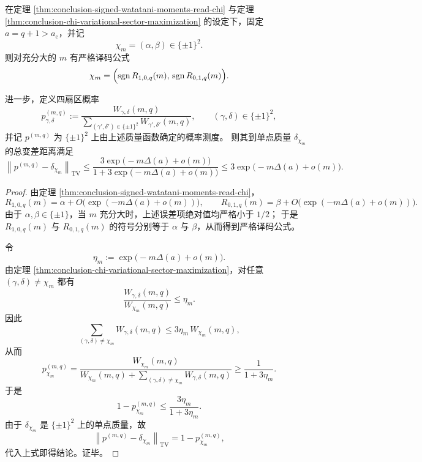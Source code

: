 \begin{theorem}[冻结相中指纹扇区的严格译码律与总变差收缩]\label{thm:conclusion-window6-sheet-parity-strict-decoding-tv}
在定理 \ref{thm:conclusion-signed-watatani-moments-read-chi} 与定理 \ref{thm:conclusion-chi-variational-sector-maximization} 的设定下，固定 \(a=q+1>a_{\mathrm c}\)，并记
\[
\chi_m=(\alpha,\beta)\in\{\pm1\}^2.
\]
则对充分大的 \(m\) 有严格译码公式
\[
\chi_m=
\Bigl(
\operatorname{sgn}R_{1,0,q}(m),\,
\operatorname{sgn}R_{0,1,q}(m)
\Bigr).
\]

进一步，定义四扇区概率
\[
p_{\gamma,\delta}^{(m,q)}
:=
\frac{W_{\gamma,\delta}(m,q)}
{\sum_{(\gamma',\delta')\in\{\pm1\}^2}W_{\gamma',\delta'}(m,q)},
\qquad
(\gamma,\delta)\in\{\pm1\}^2,
\]
并记 \(p^{(m,q)}\) 为 \(\{\pm1\}^2\) 上由上述质量函数确定的概率测度。
则其到单点质量 \(\delta_{\chi_m}\) 的总变差距离满足
\[
\left\|p^{(m,q)}-\delta_{\chi_m}\right\|_{\mathrm{TV}}
\le
\frac{3\exp\!\bigl(-m\Delta(a)+o(m)\bigr)}
{1+3\exp\!\bigl(-m\Delta(a)+o(m)\bigr)}
\le
3\exp\!\bigl(-m\Delta(a)+o(m)\bigr).
\]
\end{theorem}
\begin{proof}
由定理 \ref{thm:conclusion-signed-watatani-moments-read-chi}，
\[
R_{1,0,q}(m)=\alpha+O\!\bigl(\exp(-m\Delta(a)+o(m))\bigr),
\qquad
R_{0,1,q}(m)=\beta+O\!\bigl(\exp(-m\Delta(a)+o(m))\bigr).
\]
由于 \(\alpha,\beta\in\{\pm1\}\)，当 \(m\) 充分大时，上述误差项绝对值均严格小于 \(1/2\)；
于是 \(R_{1,0,q}(m)\) 与 \(R_{0,1,q}(m)\) 的符号分别等于 \(\alpha\) 与 \(\beta\)，从而得到严格译码公式。
\par
令
\[
\eta_m:=\exp\!\bigl(-m\Delta(a)+o(m)\bigr).
\]
由定理 \ref{thm:conclusion-chi-variational-sector-maximization}，对任意 \((\gamma,\delta)\neq \chi_m\) 都有
\[
\frac{W_{\gamma,\delta}(m,q)}{W_{\chi_m}(m,q)}\le \eta_m.
\]
因此
\[
\sum_{(\gamma,\delta)\neq\chi_m}W_{\gamma,\delta}(m,q)
\le
3\eta_m\,W_{\chi_m}(m,q),
\]
从而
\[
p_{\chi_m}^{(m,q)}
=
\frac{W_{\chi_m}(m,q)}
{W_{\chi_m}(m,q)+\sum_{(\gamma,\delta)\neq\chi_m}W_{\gamma,\delta}(m,q)}
\ge
\frac{1}{1+3\eta_m}.
\]
于是
\[
1-p_{\chi_m}^{(m,q)}
\le
\frac{3\eta_m}{1+3\eta_m}.
\]
由于 \(\delta_{\chi_m}\) 是 \(\{\pm1\}^2\) 上的单点质量，故
\[
\left\|p^{(m,q)}-\delta_{\chi_m}\right\|_{\mathrm{TV}}
=
1-p_{\chi_m}^{(m,q)},
\]
代入上式即得结论。证毕。
\end{proof}

